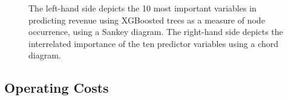 \documentclass[review,12pt,authoryear]{elsarticle}
\begin{document}
\begin{linenumbers}
\begin{figure}[htb]
  \label{fig:revenue_sankey}
  \caption{The left-hand side depicts the 10 most important variables in predicting revenue using XGBoosted trees as a measure of node occurrence, using a Sankey diagram. The right-hand side depicts the interrelated importance of the ten predictor variables using a chord diagram.}
 \end{figure}

\subsection{Operating Costs}



\end{linenumbers}
\end{document}
